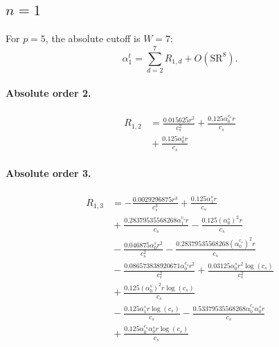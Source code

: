 \documentclass[10pt]{article}
\begin{document}
\subsection{$n=1$}
For $p=5$, the absolute cutoff is $W=7$:
\[\alpha_{1}^t=\sum_{d=2}^{7}R_{1,d}+O(\mathrm{SR}^{8}).\]
\paragraph{Absolute order 2.}
\begin{align*}
R_{1,2} &= \frac{0.015625 r^{2}}{c_{s}^{2}} + \frac{0.125 \alpha_{0}^{c_s} r}{c_{s}} \\
&{}  + \frac{0.125 \alpha_{0}^s r}{c_{s}}
\end{align*}

\paragraph{Absolute order 3.}
\begin{align*}
R_{1,3} &=  - \frac{0.0029296875 r^{3}}{c_{s}^{3}} + \frac{0.125 \alpha_{1}^s r}{c_{s}} \\
&{}  + \frac{0.28379535568268 \alpha_{1}^{c_s} r}{c_{s}} - \frac{0.125 \left(\alpha_{0}^s\right)^{2} r}{c_{s}} \\
&{}  - \frac{0.046875 \alpha_{0}^s r^{2}}{c_{s}^{2}} - \frac{0.28379535568268 \left(\alpha_{0}^{c_s}\right)^{2} r}{c_{s}} \\
&{}  - \frac{0.086573838920671 \alpha_{0}^{c_s} r^{2}}{c_{s}^{2}} + \frac{0.03125 \alpha_{0}^s r^{2} \log{\left(c_{s} \right)}}{c_{s}^{2}} \\
&{}  + \frac{0.125 \left(\alpha_{0}^s\right)^{2} r \log{\left(c_{s} \right)}}{c_{s}} \\
&{}  - \frac{0.125 \alpha_{1}^s r \log{\left(c_{s} \right)}}{c_{s}} - \frac{0.53379535568268 \alpha_{0}^{c_s} \alpha_{0}^s r}{c_{s}} \\
&{}  + \frac{0.125 \alpha_{0}^{c_s} \alpha_{0}^s r \log{\left(c_{s} \right)}}{c_{s}}
\end{align*}
\end{document}

